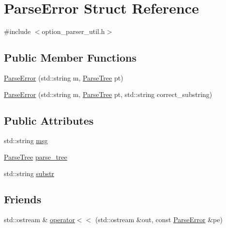 \hypertarget{structParseError}{\section{Parse\-Error Struct Reference}
\label{structParseError}
}


{\ttfamily \#include $<$option\-\_\-parser\-\_\-util.\-h$>$}

\subsection*{Public Member Functions}
\begin{DoxyCompactItemize}
\item 
\hyperlink{structParseError_ae4ce83a14844f770474eb4eb4cb9eb7b}{Parse\-Error} (std\-::string m, \hyperlink{option__parser__util_8h_aec975d670a266efbd55f05ed9f9baf9a}{Parse\-Tree} pt)
\item 
\hyperlink{structParseError_adf51cda54b65b5f2688bcc2fc97cc1f0}{Parse\-Error} (std\-::string m, \hyperlink{option__parser__util_8h_aec975d670a266efbd55f05ed9f9baf9a}{Parse\-Tree} pt, std\-::string correct\-\_\-substring)
\end{DoxyCompactItemize}
\subsection*{Public Attributes}
\begin{DoxyCompactItemize}
\item 
std\-::string \hyperlink{structParseError_a227713acbd1e08bfa58164bc5ff8f37c}{msg}
\item 
\hyperlink{option__parser__util_8h_aec975d670a266efbd55f05ed9f9baf9a}{Parse\-Tree} \hyperlink{structParseError_ab28a854e1adab7bda64f95f4fe3abf0e}{parse\-\_\-tree}
\item 
std\-::string \hyperlink{structParseError_afdf019ca7c83bb77412262baf3c319ee}{substr}
\end{DoxyCompactItemize}
\subsection*{Friends}
\begin{DoxyCompactItemize}
\item 
std\-::ostream \& \hyperlink{structParseError_a8771d42c0a5e974fdb05025da25efbfe}{operator$<$$<$} (std\-::ostream \&out, const \hyperlink{structParseError}{Parse\-Error} \&pe)
\end{DoxyCompactItemize}


